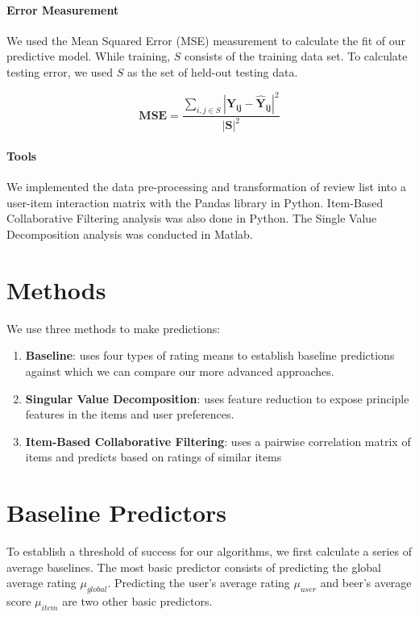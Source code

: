 \documentclass[12pt]{article}
\begin{document}
\paragraph{Error Measurement}
We used the Mean Squared Error (MSE) measurement to calculate the fit of our predictive model. While training, $S$ consists of the training data set. To calculate testing error, we used $S$ as the set of held-out testing data.

$$ \mathbf{MSE} = \frac{\sum\limits_{i,j \in S} {\mathbf{|Y_{ij} - \hat{Y}_{ij}|}}^2}{{\mathbf{|S|}}^2} $$

\paragraph{Tools}
We implemented the data pre-processing and transformation of review list into a user-item interaction matrix with the Pandas library in Python. Item-Based Collaborative Filtering analysis was also done in Python. The Single Value Decomposition analysis was conducted in Matlab.

\section{Methods}
We use three methods to make predictions:

\begin{enumerate}
  \item \textbf{Baseline}: uses four types of rating means to establish baseline predictions against which we can compare our more advanced approaches.
  \item \textbf{Singular Value Decomposition}: uses feature reduction to expose principle features in the items and user preferences.
  \item \textbf{Item-Based Collaborative Filtering}: uses a pairwise correlation matrix of items and predicts based on ratings of similar items
\end{enumerate}

\section{Baseline Predictors}
To establish a threshold of success for our algorithms, we first calculate a series of average baselines. The most basic predictor consists of predicting the global average rating $\mu_{global}$. Predicting the user's average rating $\mu_{user}$ and beer's average score $\mu_{item}$ are two other basic predictors.
\end{document}
